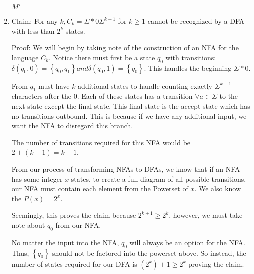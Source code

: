 \documentclass{article}
\newcommand{\set}[1]{{\left\{#1\right\}}}    %
\begin{document}
\begin{enumerate}
        $M'$ \\
    \item %
        Claim: For any $k, C_k = \Sigma*0\Sigma^{k-1}$ for $k \geq 1$ cannot be recognized by a DFA with less than $2^k$ states.

        Proof: We will begin by taking note of the construction of an NFA for the language $C_k$.
        Notice there must first be a state $q_0$ with transitions: $\delta(q_0, 0) = \set{q_0, q_1} and \delta(q_0, 1) = \set{q_0}$.
        This handles the beginning $\Sigma*0$.

        From $q_1$ must have $k$ additional states to handle counting exactly $\Sigma^{k-1}$ characters after the $0$.
        Each of these states has a transition $\forall a \in \Sigma$ to the next state except the final state.
        This final state is the accept state which has no transitions outbound.
        This is because if we have any additional input, we want the NFA to disregard this branch.

        The number of transitions required for this NFA would be $2 + (k - 1) = k + 1$.

        From our process of transforming NFAs to DFAs, we know that if an NFA has some integer $x$ states, to create a full diagram of all possible transitions, our NFA must contain each element from the Powerset of $x$.
        We also know the $P(x) = 2^x$.

        Seemingly, this proves the claim because $2^{k+1} \geq 2^k$, however, we must take note about $q_0$ from our NFA.

        No matter the input into the NFA, $q_0$ will always be an option for the NFA.
        Thus, $\set{q_0}$ should not be factored into the powerset above.
        So instead, the number of states required for our DFA is $(2^k) + 1 \geq 2^k$ proving the claim.
\end{enumerate}
\end{document}
